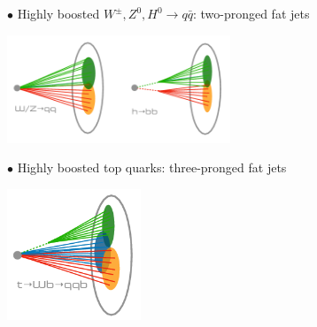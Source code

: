 \documentclass[9pt,a4paper,unknownkeysallowed,xcolor=dvipsnames,aspectratio=43]{beamer}
\begin{document}
\begin{frame}
\vspace{2mm}

{\color{darkred}\Large$\bullet$} Highly boosted $W^\pm, Z^0, H^0\to q\bar{q}$: {\color{red}two-pronged fat jets}\\
\vspace{1mm}
\begin{center}
\includegraphics[width=0.5\textwidth]{01/bosonjets.png}
\end{center}
\vspace{2mm}
{\color{darkred}\Large$\bullet$} Highly boosted top quarks: {\color{red}three-pronged fat jets}\\
\vspace{1mm}
\begin{center}
\includegraphics[width=0.3\textwidth]{01/tjets.png}
\end{center}


\end{frame}
%
%
\end{document}
